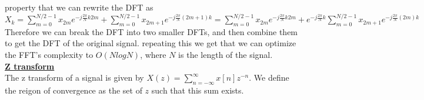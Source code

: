 \documentclass[9pt]{article}
\begin{document}
property that we can rewrite the DFT as 
$X_k=\sum_{m=0}^{N/2-1}x_{2m}e^{-j\frac{2\pi}{N}k2m}+\sum_{m=0}^{N/2-1}x_{2m+1}e^{-j\frac{2\pi}{N}(2m+1)k}
=\sum_{m=0}^{N/2-1}x_{2m}e^{-j\frac{2\pi}{N}k2m}+e^{-j\frac{2\pi}{N}k}\sum_{m=0}^{N/2-1}x_{2m+1}e^{-j\frac{2\pi}{N}(2m)k}$
Therefore we can break the DFT into two smaller DFTs, and then combine them to get the DFT of the original signal.
repeating this we get that we can optimize the FFT's complexity to 
$O(NlogN)$, where $N$ is the length of the signal.\\
\underline{\textbf{Z transform}}\\
The z transform of a signal is given by $X(z)=\sum_{n=-\infty}^{\infty}x[n]z^{-n}$. We define the 
reigon of convergence as the set of $z$ such that this sum exists. 
\end{document}
